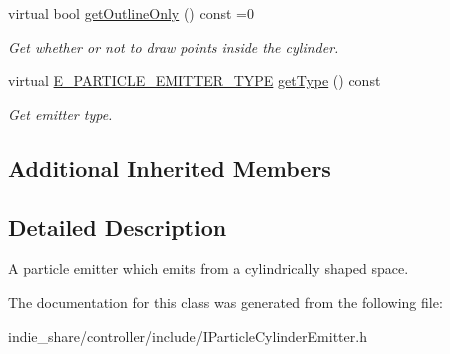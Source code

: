 \begin{DoxyCompactItemize}
virtual bool \hyperlink{classirr_1_1scene_1_1IParticleCylinderEmitter_a624cebc97c4984a6d713d5ae1efe2d8e}{get\+Outline\+Only} () const =0
\begin{DoxyCompactList}\small\item\em Get whether or not to draw points inside the cylinder. \end{DoxyCompactList}\item 
\mbox{\label{classirr_1_1scene_1_1IParticleCylinderEmitter_a644dc9a329d371cc0c1f92212c4f2c60}} 
virtual \hyperlink{namespaceirr_1_1scene_a3e251a881c886884a78adea2e546272b}{E\+\_\+\+P\+A\+R\+T\+I\+C\+L\+E\+\_\+\+E\+M\+I\+T\+T\+E\+R\+\_\+\+T\+Y\+PE} \hyperlink{classirr_1_1scene_1_1IParticleCylinderEmitter_a644dc9a329d371cc0c1f92212c4f2c60}{get\+Type} () const
\begin{DoxyCompactList}\small\item\em Get emitter type. \end{DoxyCompactList}\end{DoxyCompactItemize}
\subsection*{Additional Inherited Members}


\subsection{Detailed Description}
A particle emitter which emits from a cylindrically shaped space. 

The documentation for this class was generated from the following file\+:\begin{DoxyCompactItemize}
\item 
indie\+\_\+share/controller/include/I\+Particle\+Cylinder\+Emitter.\+h\end{DoxyCompactItemize}
